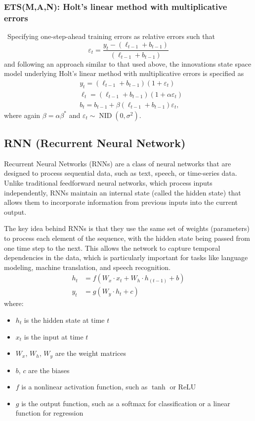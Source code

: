 \documentclass{ieeeojies}
\begin{document}
\subsubsection{ETS(M,A,N): Holt’s linear method with multiplicative errors} \
Specifying one-step-ahead training errors as relative errors such that
$$
\varepsilon_t=\frac{y_t-\left(\ell_{t-1}+b_{t-1}\right)}{\left(\ell_{t-1}+b_{t-1}\right)}
$$
and following an approach similar to that used above, the innovations state space model underlying Holt's linear method with multiplicative errors is specified as
$$
\begin{aligned}
& y_t=\left(\ell_{t-1}+b_{t-1}\right)\left(1+\varepsilon_t\right) \\
& \ell_t=\left(\ell_{t-1}+b_{t-1}\right)\left(1+\alpha \varepsilon_t\right) \\
& b_t=b_{t-1}+\beta\left(\ell_{t-1}+b_{t-1}\right) \varepsilon_t,
\end{aligned}
$$
where again $\beta=\alpha \beta^*$ and $\varepsilon_t \sim \operatorname{NID}\left(0, \sigma^2\right)$.

\subsection{RNN (Recurrent Neural Network)}
Recurrent Neural Networks (RNNs) are a class of neural networks that are designed to process sequential data, such as text, speech, or time-series data. Unlike traditional feedforward neural networks, which process inputs independently, RNNs maintain an internal state (called the hidden state) that allows them to incorporate information from previous inputs into the current output.

The key idea behind RNNs is that they use the same set of weights (parameters) to process each element of the sequence, with the hidden state being passed from one time step to the next. This allows the network to capture temporal dependencies in the data, which is particularly important for tasks like language modeling, machine translation, and speech recognition.
$$
\begin{aligned}
	h_t &= f(W_x \cdot x_t + W_h \cdot h_{(t-1)} + b) \\
	y_t &= g(W_y \cdot h_t + c)
\end{aligned}
$$
where:
\begin{itemize}
	\item $h_t$ is the hidden state at time $t$
	\item $x_t$ is the input at time $t$
	\item $W_x$, $W_h$, $W_y$ are the weight matrices
	\item $b$, $c$ are the biases
	\item $f$ is a nonlinear activation function, such as $\tanh$ or $\text{ReLU}$
	\item $g$ is the output function, such as a softmax for classification or a linear function for regression
\end{itemize}
\end{document}
